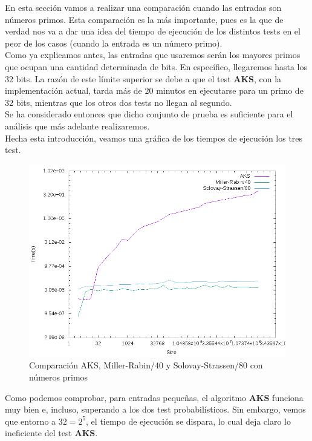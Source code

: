 En esta sección vamos a realizar una comparación cuando las entradas son números primos. Esta comparación es la más importante, pues es la que de verdad nos va a dar una idea del tiempo de ejecución de los distintos tests en el peor de los casos (cuando la entrada es un número primo).\\

Como ya explicamos antes, las entradas que usaremos serán los mayores primos que ocupan una cantidad determinada de bits. En específico, llegaremos hasta los $32$ bits. La razón de este límite superior se debe a que el test \textbf{AKS}, con la implementación actual, tarda más de $20$ minutos en ejecutarse para un primo de $32$ bits, mientras que los otros dos tests no llegan al segundo.\\

Se ha considerado entonces que dicho conjunto de prueba es suficiente para el análisis que más adelante realizaremos.\\

Hecha esta introducción, veamos una gráfica de los tiempos de ejecución los tres test.

\begin{figure}[H]
	\centering
	\includegraphics[totalheight=12cm]{img/graphs/aks-probs-primes-mean}
	\caption{Comparación AKS, Miller-Rabin/40 y Solovay-Strassen/80 con números primos}
\end{figure}

Como podemos comprobar, para entradas pequeñas, el algoritmo \textbf{AKS} funciona muy bien e, incluso, superando a los dos test probabilísticos. Sin embargo, vemos que entorno a $32 = 2^5$, el tiempo de ejecución se dispara, lo cual deja claro lo ineficiente del test \textbf{AKS}.\\

